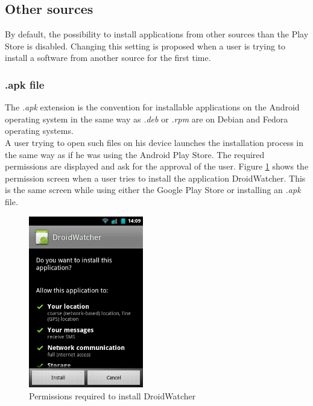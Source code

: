 
\subsection{Other sources}
By default, the possibility to install applications from other sources than the Play Store is disabled.
Changing this setting is proposed when a user is trying to install a software from another source for the first time.

\subsubsection{.apk file}
The \emph{.apk} extension is the convention for installable applications on the Android operating system in the same way as \emph{.deb} or \emph{.rpm} are on Debian and Fedora operating systems.\\

A user trying to open such files on his device launches the installation process in the same way as if he was using the Android Play Store.
The required permissions are displayed and ask for the approval of the user.
Figure \ref{fig:perm-dw} shows the permission screen when a user tries to install the application DroidWatcher.
This is the same screen while using either the Google Play Store or installing an \emph{.apk} file.\\

\begin{figure}[h]
  \centering
  \includegraphics[width=5cm]{images/permissions.png}
  \caption{Permissions required to install DroidWatcher}
  \label{fig:perm-dw}
\end{figure}

